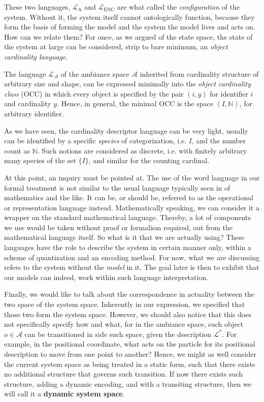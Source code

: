 These two languages, $\mathcal{L}_{\mathrm{A}}$ and $\mathcal{L}_{\mathrm{ENC}}$ are what called the \textit{configuration} of the system. Without it, the system itself cannot ontologically function, because they form the basis of forming the model and the system the model lives and acts on. How can we relate them? For once, as we argued of the state space, the state of the system at large can be considered, strip to bare minimum, an \textit{object cardinality language}. 

\begin{definition}
  The language $\mathcal{L}_{\mathcal{A}}$ of the ambiance space $\mathcal{A}$ inherited from cardinality structure of arbitrary size and shape, can be expressed minimally into the \textit{object cardinality class} (OCC) in which every object is specified by the pair $(i,y)$ for identifier $i$ and cardinality $y$. Hence, in general, the minimal OCC is the space $(I,\mathbb{N})$, for arbitrary identifier.
\end{definition}

As we have seen, the cardinality descriptor language can be very light, usually can be identified by a specific \textit{species} of categorization, i.e. $I$, and the number count as $\mathbb{N}$. Such notions are considered as discrete, i.e. with finitely arbitrary many species of the set $\{I\}$, and similar for the counting cardinal. 

At this point, an inquiry must be pointed at. The use of the word language in our formal treatment is not similar to the usual language typically seen in of mathematics and the like. It can be, or should be, referred to as the operational or representation language instead. Mathematically speaking, we can consider it a wrapper on the standard mathematical language. Thereby, a lot of components we use would be taken without proof or formalism required, out from the mathematical language itself. So what is it that we are actually using? These languages have the role to describe the system in certain manner only, within a scheme of quantization and an encoding method. For now, what we are discussing refers to the system without the \textit{model} in it. The goal later is then to exhibit that our models can indeed, work within such language interpretation. 

Finally, we would like to talk about the correspondence in actuality between the two space of the system space. Inherently in our expression, we specified that those two form the system space. However, we should also notice that this does not specifically specify how and what, for in the ambiance space, such object $o\in \mathcal{A}$ can be transitioned in side such space, given the description $\mathcal{L}^{*}$. For example, in the positional coordinate, what acts on the particle for its positional description to move from one point to another? Hence, we might as well consider the current system space as being treated in a static form, such that there exists no additional structure that governs such transition. If now there exists such structure, adding a dynamic encoding, and with a transiting structure, then we will call it a \textbf{dynamic system space}.

